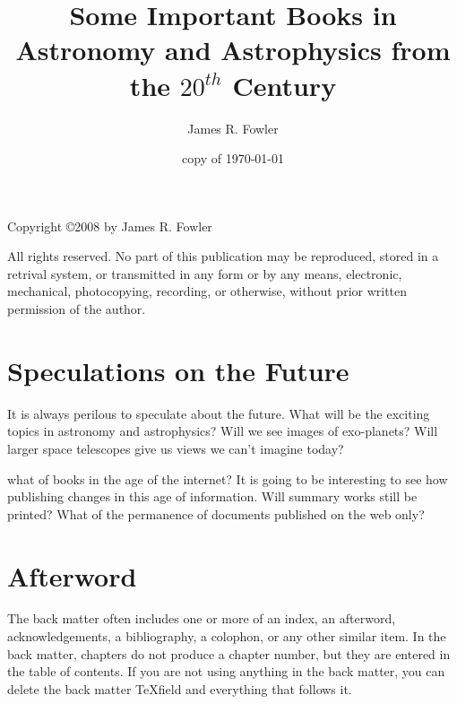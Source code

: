 \documentclass{book}%
\newcommand{\Cen}[1]{\ensuremath{#1^{th}} Century}
\begin{document}
\frontmatter
\title{Some Important Books in Astronomy and Astrophysics from the \Cen{20}}
\author{James R. Fowler}
\date{copy of \today}
\maketitle

\vspace*{5 in}
Copyright \copyright 2008 by James R. Fowler

All rights reserved. No part of this publication may be
reproduced, stored in a retrival system, or transmitted
in any form or by any means, electronic, mechanical,
photocopying, recording, or otherwise, without prior written
permission of the author.

\tableofcontents


\mainmatter









\chapter{Speculations on the Future}

It is always perilous to speculate about the future.
What will be the exciting topics in astronomy and astrophysics?
Will we see images of exo-planets?  Will larger space telescopes
give us views we can't imagine today?

what of books in the age of the internet?
It is going to be interesting to see how publishing
changes in this age of information.  Will
summary works still be printed? What of the permanence
of documents published on the web only? 

\appendix



\backmatter





\chapter{Afterword}

The back matter often includes one or more of an index, an afterword,
acknowledgements, a bibliography, a colophon, or any other similar item. In
the back matter, chapters do not produce a chapter number, but they are
entered in the table of contents. If you are not using anything in the back
matter, you can delete the back matter \TeX field and everything that follows it.

%
%
\end{document}
